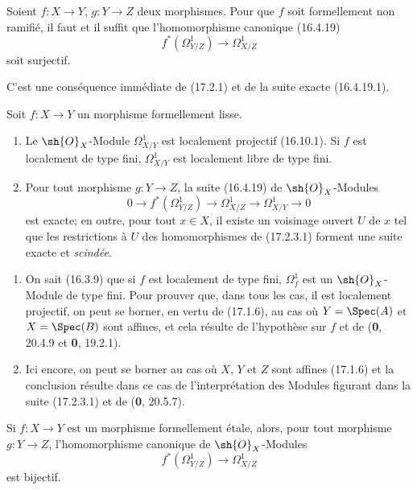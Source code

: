 \begin{corollary}[17.2.2]
\label{IV.17.2.2}
Soient $f:X\to Y$, $g:Y\to Z$ deux morphismes. Pour que $f$ soit formellement non ramifié, il faut et il suffit que l'homomorphisme canonique \textup{(16.4.19)}
\[
  f^*(\varOmega_{Y/Z}^1)\longrightarrow\varOmega_{X/Z}^1
\]
soit surjectif.
\end{corollary}

C'est une conséquence immédiate de (17.2.1) et de la suite exacte (16.4.19.1).

\begin{proposition}[17.2.3]
\label{IV.17.2.3}
Soit $f:X\to Y$ un morphisme formellement lisse.
\begin{enumerate}
  \item[\textup{(i)}] Le $\sh{O}_X$-Module $\varOmega_{X/Y}^1$ est localement projectif \textup{(16.10.1)}. Si $f$ est localement de type fini, $\varOmega_{X/Y}^1$ est localement libre de type fini.
  \item[\textup{(ii)}] Pour tout morphisme $g:Y\to Z$, la suite \textup{(16.4.19)} de $\sh{O}_X$-Modules
  \[
  \label{IV.17.2.3.1}
    0\longrightarrow f^*(\varOmega_{Y/Z}^1)\longrightarrow\varOmega_{X/Z}^1\longrightarrow\varOmega_{X/Y}^1\longrightarrow0
    \tag{17.2.3.1}
  \]
  est exacte; en outre, pour tout $x\in X$, il existe un voisinage ouvert $U$ de $x$ tel que les restrictions à $U$ des homomorphismes de \textup{(17.2.3.1)} forment une suite exacte et \emph{scindée}.
\end{enumerate}
\end{proposition}

\begin{enumerate}
  \item[(i)] On sait (16.3.9) que si $f$ est localement de type fini, $\varOmega_f^1$ est un $\sh{O}_X$-Module de type fini. Pour prouver que, dans tous les cas, il est localement projectif, on peut se borner, en vertu de (17.1.6), au cas où $Y=\Spec(A)$ et $X=\Spec(B)$ sont affines, et cela résulte de l'hypothèse sur $f$ et de (\textbf{0}, 20.4.9 et \textbf{0}, 19.2.1).
  \item[(ii)] Ici encore, on peut se borner au cas où $X$, $Y$ et $Z$ sont affines (17.1.6) et la conclusion résulte dans ce cas de l'interprétation des Modules figurant dans la suite (17.2.3.1) et de (\textbf{0}, 20.5.7).
\end{enumerate}

\begin{corollary}[17.2.4]
\label{IV.17.2.4}
Si $f:X\to Y$ est un morphisme formellement étale, alors, pour tout morphisme $g:Y\to Z$, l'homomorphisme canonique de $\sh{O}_X$-Modules
\[
  f^*(\varOmega_{Y/Z}^1)\longrightarrow\varOmega_{X/Z}^1
\]
est bijectif.
\end{corollary}

